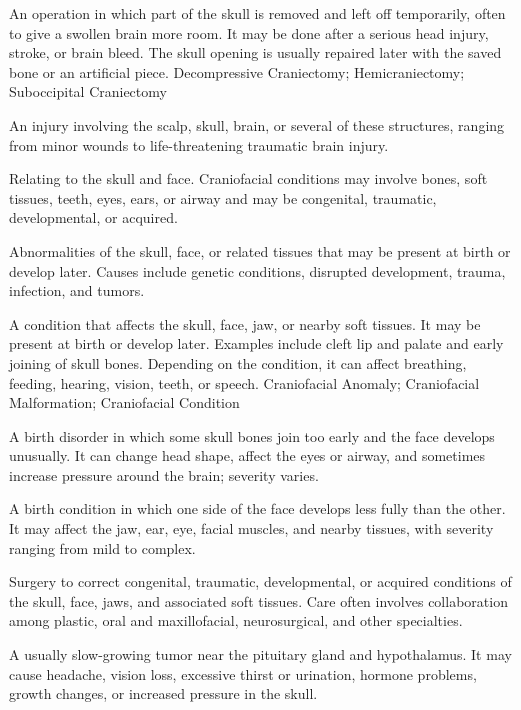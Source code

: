  An operation in which part of the skull is removed and left off temporarily, often to give a swollen brain more room. It may be done after a serious head injury, stroke, or brain bleed. The skull opening is usually repaired later with the saved bone or an artificial piece.
\synonyms
Decompressive Craniectomy; Hemicraniectomy; Suboccipital Craniectomy


 An injury involving the scalp, skull, brain, or several of these structures, ranging from minor wounds to life-threatening traumatic brain injury.

 Relating to the skull and face. Craniofacial conditions may involve bones, soft tissues, teeth, eyes, ears, or airway and may be congenital, traumatic, developmental, or acquired.

 Abnormalities of the skull, face, or related tissues that may be present at birth or develop later. Causes include genetic conditions, disrupted development, trauma, infection, and tumors.

 A condition that affects the skull, face, jaw, or nearby soft tissues. It may be present at birth or develop later. Examples include cleft lip and palate and early joining of skull bones. Depending on the condition, it can affect breathing, feeding, hearing, vision, teeth, or speech.
\synonyms
Craniofacial Anomaly; Craniofacial Malformation; Craniofacial Condition

 A birth disorder in which some skull bones join too early and the face develops unusually. It can change head shape, affect the eyes or airway, and sometimes increase pressure around the brain; severity varies.

 A birth condition in which one side of the face develops less fully than the other. It may affect the jaw, ear, eye, facial muscles, and nearby tissues, with severity ranging from mild to complex.

 Surgery to correct congenital, traumatic, developmental, or acquired conditions of the skull, face, jaws, and associated soft tissues. Care often involves collaboration among plastic, oral and maxillofacial, neurosurgical, and other specialties.


 A usually slow-growing tumor near the pituitary gland and hypothalamus. It may cause headache, vision loss, excessive thirst or urination, hormone problems, growth changes, or increased pressure in the skull.

